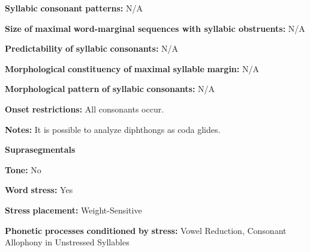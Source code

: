 \documentclass[output=paper]{langsci/langscibook}
\begin{document}
\begin{styleBody}
\textbf{Syllabic} \textbf{consonant} \textbf{patterns:} N/A
\end{styleBody}

\begin{styleBody}
\textbf{Size} \textbf{of} \textbf{maximal} \textbf{word{}-marginal sequences with syllabic obstruents:}  N/A
\end{styleBody}

\begin{styleBody}
\textbf{Predictability} \textbf{of} \textbf{syllabic} \textbf{consonants:} N/A
\end{styleBody}

\begin{styleBody}
\textbf{Morphological} \textbf{constituency} \textbf{of} \textbf{maximal} \textbf{syllable} \textbf{margin:} N/A
\end{styleBody}

\begin{styleBody}
\textbf{Morphological} \textbf{pattern} \textbf{of} \textbf{syllabic} \textbf{consonants:} N/A
\end{styleBody}

\begin{styleBody}
\textbf{Onset} \textbf{restrictions:} All consonants occur.
\end{styleBody}

\begin{styleBody}
\textbf{Notes:} It is possible to analyze diphthongs as coda glides.
\end{styleBody}

\begin{styleBody}
\textbf{Suprasegmentals}
\end{styleBody}

\begin{styleBody}
\textbf{Tone:} No
\end{styleBody}

\begin{styleBody}
\textbf{Word} \textbf{stress:} Yes
\end{styleBody}

\begin{styleBody}
\textbf{Stress} \textbf{placement:} Weight-Sensitive
\end{styleBody}

\begin{styleBody}
\textbf{Phonetic} \textbf{processes} \textbf{conditioned} \textbf{by} \textbf{stress:} Vowel Reduction, Consonant Allophony in Unstressed Syllables
\end{styleBody}
\end{document}

